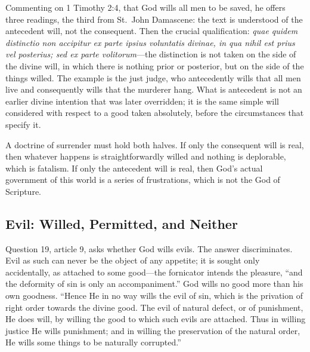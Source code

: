 Commenting on 1 Timothy 2:4, that God wills all men to be saved, he offers three readings, the third from St.~John Damascene: the text is understood of the antecedent will, not the consequent. Then the crucial qualification: \emph{quae quidem distinctio non accipitur ex parte ipsius voluntatis divinae, in qua nihil est prius vel posterius; sed ex parte volitorum}---the distinction is not taken on the side of the divine will, in which there is nothing prior or posterior, but on the side of the things willed. The example is the just judge, who antecedently wills that all men live and consequently wills that the murderer hang. What is antecedent is not an earlier divine intention that was later overridden; it is the same simple will considered with respect to a good taken absolutely, before the circumstances that specify it.

A doctrine of surrender must hold both halves. If only the consequent will is real, then whatever happens is straightforwardly willed and nothing is deplorable, which is fatalism. If only the antecedent will is real, then God's actual government of this world is a series of frustrations, which is not the God of Scripture.

\subsection{Evil: Willed, Permitted, and Neither}

Question 19, article 9, asks whether God wills evils. The answer discriminates. Evil as such can never be the object of any appetite; it is sought only accidentally, as attached to some good---the fornicator intends the pleasure, ``and the deformity of sin is only an accompaniment.'' God wills no good more than his own goodness. ``Hence He in no way wills the evil of sin, which is the privation of right order towards the divine good. The evil of natural defect, or of punishment, He does will, by willing the good to which such evils are attached. Thus in willing justice He wills punishment; and in willing the preservation of the natural order, He wills some things to be naturally corrupted.''

